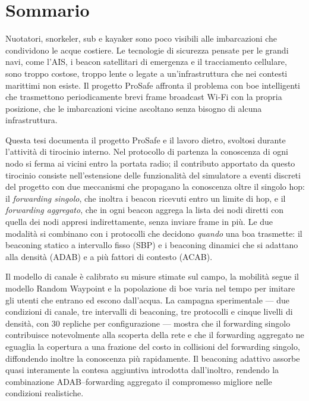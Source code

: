 \chapter*{Sommario}

Nuotatori, snorkeler, sub e kayaker sono poco visibili alle imbarcazioni che
condividono le acque costiere. Le tecnologie di sicurezza pensate per le grandi
navi, come l'AIS, i beacon satellitari di emergenza e il tracciamento cellulare,
sono troppo costose, troppo lente o legate a un'infrastruttura che nei contesti marittimi non
esiste. Il progetto ProSafe affronta il problema con boe intelligenti che
trasmettono periodicamente brevi frame broadcast Wi-Fi con la propria
posizione, che le imbarcazioni vicine ascoltano senza bisogno di alcuna
infrastruttura.

Questa tesi documenta il progetto ProSafe e il lavoro dietro, svoltosi durante 
l'attivit\`a di tirocinio interno. Nel protocollo di partenza la
conoscenza di ogni nodo si ferma ai vicini entro la portata radio; il contributo apportato da questo tirocinio 
consiste nell'estensione delle funzionalit\`a del simulatore a eventi discreti del progetto con due
meccanismi che propagano la conoscenza oltre il singolo hop: il
\emph{forwarding singolo}, che inoltra i beacon ricevuti entro un limite di
hop, e il \emph{forwarding aggregato}, che in ogni beacon aggrega la lista dei nodi diretti
con quella dei nodi appresi indirettamente, senza inviare frame in pi\`u. Le due modalit\`a si combinano con i
protocolli che decidono \emph{quando} una boa trasmette: il beaconing statico
a intervallo fisso (SBP) e i beaconing dinamici che si adattano alla densit\`a (ADAB) e a pi\`u fattori di contesto (ACAB).

Il modello di canale \`e calibrato su misure stimate sul campo, la mobilit\`a segue
il modello Random Waypoint e la popolazione di boe varia nel tempo per
imitare gli utenti che entrano ed escono dall'acqua. La campagna sperimentale
--- due condizioni di canale, tre intervalli di beaconing, tre protocolli e
cinque livelli di densit\`a, con 30 repliche per configurazione --- mostra
che il forwarding singolo contribuisce notevolmente alla scoperta della rete e che il
forwarding aggregato ne eguaglia la copertura a una frazione del costo in
collisioni del forwarding singolo, diffondendo inoltre la conoscenza pi\`u
rapidamente. Il beaconing adattivo assorbe quasi interamente la contesa
aggiuntiva introdotta dall'inoltro, rendendo la combinazione ADAB--forwarding
aggregato il compromesso migliore nelle condizioni realistiche.
